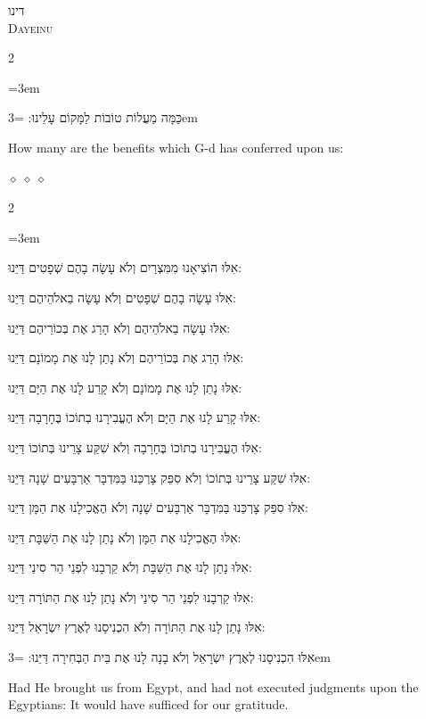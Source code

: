 \documentclass[11pt, openany]{book}
\newenvironment{bilingual}{%
  \par\vspace{4pt}%
  \begin{paracol}{2}%
}{%
  \end{paracol}%
  \par\vspace{2pt}%
}
\newenvironment{hebrewcol}{%
  \switchcolumn[1]%
  \begingroup
  \RTL
  \hebrewfont\large
  \setstretch{1.4}%
  \emergencystretch=3em
  \tolerance=9999
  \parindent=0pt\relax
}{%
  \endRTL
  \endgroup
}
\newenvironment{englishcol}{%
  \switchcolumn[0]%
  \begingroup
  \setstretch{1.4}%
  \emergencystretch=3em
  \tolerance=9999
  \normalsize
  \rightskip=0.12in\relax
}{%
  \endgroup
}
\newcommand{\parasep}{%
  \par\vspace{3pt}
  \begin{center}
    \textcolor{sedergold!50}{\tiny$\diamond\;\diamond\;\diamond$}
  \end{center}
  \par\vspace{3pt}
}
\newcommand{\subsedertitle}[2]{%
  \par\vspace{8pt}
  \begin{center}
    {\hebrewfontsanslarge\textcolor{sederblue}{\beginR #1\endR}}\\[3pt]
    {\normalsize\scshape\textcolor{sederblue}{#2}}
  \end{center}
  \par\vspace{3pt}
}
\begin{document}
\subsedertitle{דינו}{Dayeinu}


\begin{bilingual}
\begin{hebrewcol}
כַּמָּה מַעֲלוֹת טוֹבוֹת לַמָּקוֹם עָלֵינוּ:
\end{hebrewcol}
\begin{englishcol}
How many are the benefits which G-d has conferred upon us:
\end{englishcol}
\end{bilingual}
\parasep

\begin{bilingual}
\begin{hebrewcol}
אִלּוּ הוֹצִיאָנוּ מִמִּצְרַיִם וְלֹא עָשָׂה בָהֶם שְׁפָטִים דַּיֵּנוּ:

אִלּוּ עָשָׂה בָהֶם שְׁפָטִים וְלֹא עָשָׂה בֵאלֹהֵיהֶם דַּיֵּנוּ:

אִלּוּ עָשָׂה בֵאלֹהֵיהֶם וְלֹא הָרַג אֶת בְּכוֹרֵיהֶם דַּיֵּנוּ:

אִלּוּ הָרַג אֶת בְּכוֹרֵיהֶם וְלֹא נָתַן לָנוּ אֶת מָמוֹנָם דַּיֵּנוּ:

אִלּוּ נָתַן לָנוּ אֶת מָמוֹנָם וְלֹא קָרַע לָנוּ אֶת הַיָּם דַּיֵּנוּ:

אִלּוּ קָרַע לָנוּ אֶת הַיָּם וְלֹא הֶעֱבִירָנוּ בְתוֹכוֹ בֶּחָרָבָה דַּיֵּנוּ:

אִלּוּ הֶעֱבִירָנוּ בְתוֹכוֹ בֶּחָרָבָה וְלֹא שִׁקַּע צָרֵינוּ בְּתוֹכוֹ דַּיֵּנוּ:

אִלּוּ שִׁקַּע צָרֵינוּ בְּתוֹכוֹ וְלֹא סִפֵּק צָרְכֵּנוּ בַּמִּדְבָּר אַרְבָּעִים שָׁנָה			 דַּיֵּנוּ:

אִלּוּ סִפֵּק צָרְכֵּנוּ בַּמִּדְבָּר אַרְבָּעִים שָׁנָה וְלֹא הֶאֱכִילָנוּ אֶת הַמָּן			 דַּיֵּנוּ:

אִלּוּ הֶאֱכִילָנוּ אֶת הַמָּן וְלֹא נָתַן לָנוּ אֶת הַשַּׁבָּת דַּיֵּנוּ:

אִלּוּ נָתַן לָנוּ אֶת הַשַּׁבָּת וְלֹא קֵרְבָנוּ לִפְנֵי הַר סִינַי דַּיֵּנוּ:

אִלּוּ קֵרְבָנוּ לִפְנֵי הַר סִינַי וְלֹא נָתַן לָנוּ אֶת הַתּוֹרָה דַּיֵּנוּ:

אִלּוּ נָתַן לָנוּ אֶת הַתּוֹרָה וְלֹא הִכְנִיסָנוּ לְאֶרֶץ יִשְׂרָאֵל דַּיֵּנוּ:

אִלּוּ הִכְנִיסָנוּ לְאֶרֶץ יִשְׂרָאֵל וְלֹא בָנָה לָנוּ אֶת בֵּית הַבְּחִירָה			 דַּיֵּנוּ:
\end{hebrewcol}
\begin{englishcol}
Had He brought us from Egypt, and had not executed judgments upon the Egyptians: It would have sufficed for our gratitude.


\end{englishcol}
\end{bilingual}
\end{document}
